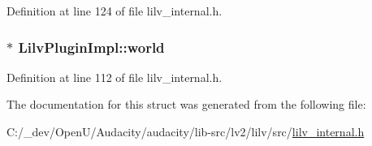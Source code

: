 Definition at line 124 of file lilv\+\_\+internal.\+h.

\subsubsection[{\texorpdfstring{world}{world}}]{$\ast$ Lilv\+Plugin\+Impl\+::world}\hypertarget{struct_lilv_plugin_impl_ae4ce79504dd83ecc9919c54cfab37ace}{}\label{struct_lilv_plugin_impl_ae4ce79504dd83ecc9919c54cfab37ace}


Definition at line 112 of file lilv\+\_\+internal.\+h.



The documentation for this struct was generated from the following file\+:\begin{DoxyCompactItemize}
\item 
C\+:/\+\_\+dev/\+Open\+U/\+Audacity/audacity/lib-\/src/lv2/lilv/src/\hyperlink{lilv__internal_8h}{lilv\+\_\+internal.\+h}\end{DoxyCompactItemize}
